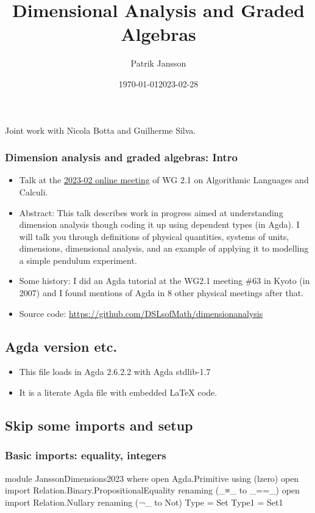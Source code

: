 \documentclass{beamer}
\author[Jansson]{Patrik Jansson}
\date{\today}
\institute[FP unit, Chalmers]{Functional Programming unit, Chalmers University of Technology}
\date{2023-02-28}
\title{Dimensional Analysis and Graded Algebras}
\begin{document}
\begin{frame}
  \maketitle
  Joint work with Nicola Botta and Guilherme Silva.
\end{frame}
\begin{frame}
\frametitle{Dimension analysis and graded algebras: Intro}
\begin{itemize}
\item Talk at the \href{https://ifipwg21wiki.cs.kuleuven.be/IFIP21/OnlineFeb23}{2023-02 online meeting} of WG 2.1 on Algorithmic Languages and Calculi.
\item Abstract:
This talk describes work in progress aimed at understanding dimension analysis
though coding it up using dependent types (in Agda). I will talk you through
definitions of physical quantities, systems of units, dimensions, dimensional
analysis, and an example of applying it to modelling a simple pendulum
experiment.
\item Some history: I did an Agda tutorial at the WG2.1 meeting \#63 in Kyoto
(in 2007) and I found mentions of Agda in 8 other physical meetings after
that.
\item Source code: \url{https://github.com/DSLsofMath/dimensionanalysis}
\end{itemize}
\subsection{Agda version etc.}
\begin{itemize}
\item This file loads in Agda 2.6.2.2 with Agda stdlib-1.7
\item It is a literate Agda file with embedded LaTeX code.
\end{itemize}
\subsection{Skip some imports and setup}
\subsubsection{Basic imports: equality, integers}
\begin{code}
module JanssonDimensions2023 where
open Agda.Primitive using (lzero)
open import Relation.Binary.PropositionalEquality renaming (_≡_ to _==_)
open import Relation.Nullary renaming (¬_ to Not)
Type = Set
Type1 = Set1


\end{code}
\end{frame}
\end{document}

